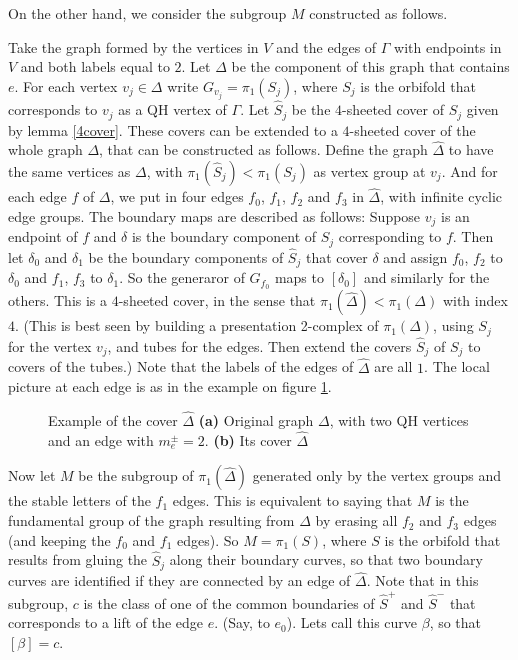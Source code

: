 \documentclass[12pt]{amsart}
\begin{document}
On the other hand, we consider the subgroup $M$ constructed as follows. 

Take the graph formed by the vertices in $V$ and the edges of $\Gamma$ with endpoints in $V$ and both labels equal to $2$. Let $\Delta$ be the component of this graph that contains $e$. For each vertex $v_j\in\Delta$ write $G_{v_j} = \pi_1(S_j)$, where $S_j$ is the orbifold that corresponds to $v_j$ as a QH vertex of $\Gamma$. Let $\hat S_j$ be the $4$-sheeted cover of $S_j$ given by lemma \ref{4cover}. These covers can be extended to a $4$-sheeted cover of the whole graph $\Delta$, that can be constructed as follows. Define the graph $\hat \Delta$ to have the same vertices as $\Delta$, with $\pi_1(\hat S_j) < \pi_1(S_j)$ as vertex group at $v_j$. And for each edge $f$ of $\Delta$, we put in four edges $f_0$, $f_1$, $f_2$ and $f_3$ in $\hat \Delta$, with infinite cyclic edge groups. The boundary maps are described as follows: Suppose $v_j$ is an endpoint of $f$ and $\delta$ is the boundary component of $S_j$ corresponding to $f$. Then let $\delta_0$ and $\delta_1$ be the boundary components of $\hat S_j$ that cover $\delta$ and assign $f_0$, $f_2$ to $\delta_0$ and $f_1$, $f_3$ to $\delta_1$. So the generaror of $G_{f_0}$ maps to $[\delta_0]$ and similarly for the others. This is a $4$-sheeted cover, in the sense that $\pi_1(\hat \Delta) < \pi_1(\Delta)$ with index $4$. (This is best seen by building a presentation 2-complex of $\pi_1(\Delta)$, using $S_j$ for the vertex $v_j$, and tubes for the edges. Then extend the covers $\hat S_j$ of $S_j$ to covers of the tubes.) Note that the labels of the edges of $\hat \Delta$ are all $1$. The local picture at each edge is as in the example on figure \ref{fig0}.


\begin{figure}[htbp]
\begin{center}

\caption{Example of the cover $\hat \Delta$ {\bf (a)} Original graph $\Delta$, with two QH vertices and an edge with $m_e^{\pm}=2$.  {\bf (b)} Its cover $\hat \Delta$ }
\label{fig0}
\end{center}
\end{figure}


Now let $M$ be the subgroup of $\pi_1(\hat \Delta)$ generated only by the vertex groups and the stable letters of the $f_1$ edges. This is equivalent to saying that $M$ is the fundamental group of the graph resulting from $\hat \Delta$ by erasing all $f_2$ and $f_3$ edges (and keeping the $f_0$ and $f_1$ edges). So $M=\pi_1(S)$, where $S$ is the orbifold that results from gluing the $\hat S_j$ along their boundary curves, so that two boundary curves are identified if they are connected by an edge of $\hat \Delta$. Note that in this subgroup, $c$ is the class of one of the common boundaries of $\hat S^+$ and $\hat S^-$ that corresponds to a lift of the edge $e$. (Say, to $e_0$). Lets call this curve $\beta$, so that $[\beta]=c$.
\end{document}
